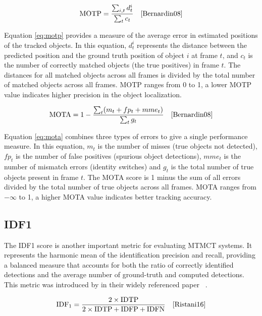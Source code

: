 \begin{equation}
    \label{eq:motp}
    \text{MOTP}=\frac{\sum_{i, t} d_t^i}{\sum_t c_t}
    \quad\text{\cite[Eq.~1]{Bernardin08}}
\end{equation}

Equation \ref{eq:motp} provides a measure of the average error in estimated positions of the tracked objects. In this equation, \(d_t^i\) represents the distance between the predicted position and the ground truth position of object \(i\) at frame \(t\), and \(c_t\) is the number of correctly matched objects (the true positives) in frame \(t\). The distances for all matched objects across all frames is divided by the total number of matched objects across all frames. MOTP ranges from 0 to 1, a lower MOTP value indicates higher precision in the object localization.

\begin{equation}
    \label{eq:mota}
    \text{MOTA}=1-\frac{\sum_t (m_t+fp_t+mme_t)}{\sum_t g_t}
    \quad\text{\cite[Eq.~2]{Bernardin08}}
\end{equation}

Equation \ref{eq:mota} combines three types of errors to give a single performance measure. In this equation, \(m_t\) is the number of misses (true objects not detected), \(fp_t\) is the number of false positives (spurious object detections), \(mme_t\) is the number of mismatch errors (identity switches) and \(g_t\) is the total number of true objects present in frame \(t\). The MOTA score is 1 minus the sum of all errors divided by the total number of true objects across all frames. MOTA ranges from \(-\infty\) to 1, a higher MOTA value indicates better tracking accuracy.

\subsection{IDF1}\label{subsec:idf1}
The IDF1 score is another important metric for evaluating MTMCT systems. It represents the harmonic mean of the identification precision and recall, providing a balanced measure that accounts for both the ratio of correctly identified detections and the average number of ground-truth and computed detections. This metric was introduced by \citeauthor{Ristani16} in their widely referenced paper ~\cite{Ristani16}.

\begin{equation}
    \label{eq:idf1}
    \text{IDF}_1 = \frac{2 \times \text{IDTP}}{2 \times \text{IDTP} + \text{IDFP} + \text{IDFN}}
    \quad\text{\cite[Eq.~11]{Ristani16}}
\end{equation}

